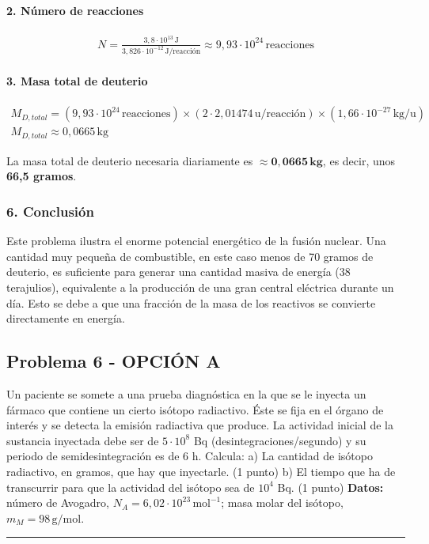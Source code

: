 \paragraph{2. Número de reacciones}
\begin{gather}
    N = \frac{3,8 \cdot 10^{13}\,\text{J}}{3,826 \cdot 10^{-12}\,\text{J/reacción}} \approx 9,93 \cdot 10^{24}\,\text{reacciones}
\end{gather}
\paragraph{3. Masa total de deuterio}
\begin{gather}
    M_{D, total} = (9,93 \cdot 10^{24}\,\text{reacciones}) \times (2 \cdot 2,01474\,\text{u/reacción}) \times (1,66 \cdot 10^{-27}\,\text{kg/u}) \nonumber \\
    M_{D, total} \approx 0,0665\,\text{kg}
\end{gather}
\begin{cajaresultado}
    La masa total de deuterio necesaria diariamente es $\boldsymbol{\approx 0,0665\,\textbf{kg}}$, es decir, unos \textbf{66,5 gramos}.
\end{cajaresultado}

\subsubsection*{6. Conclusión}
\begin{cajaconclusion}
Este problema ilustra el enorme potencial energético de la fusión nuclear. Una cantidad muy pequeña de combustible, en este caso menos de 70 gramos de deuterio, es suficiente para generar una cantidad masiva de energía (38 terajulios), equivalente a la producción de una gran central eléctrica durante un día. Esto se debe a que una fracción de la masa de los reactivos se convierte directamente en energía.
\end{cajaconclusion}

\newpage

\subsection{Problema 6 - OPCIÓN A}
\label{subsec:6A_2015_jun_ord}

\begin{cajaenunciado}
Un paciente se somete a una prueba diagnóstica en la que se le inyecta un fármaco que contiene un cierto isótopo radiactivo. Éste se fija en el órgano de interés y se detecta la emisión radiactiva que produce. La actividad inicial de la sustancia inyectada debe ser de $5\cdot10^{8}$ Bq (desintegraciones/segundo) y su periodo de semidesintegración es de 6 h. Calcula:
a) La cantidad de isótopo radiactivo, en gramos, que hay que inyectarle. (1 punto)
b) El tiempo que ha de transcurrir para que la actividad del isótopo sea de $10^{4}$ Bq. (1 punto)
\textbf{Datos:} número de Avogadro, $N_{A}=6,02\cdot10^{23}\,\text{mol}^{-1}$; masa molar del isótopo, $m_{M}=98\,\text{g/mol}$.
\end{cajaenunciado}
\hrule

